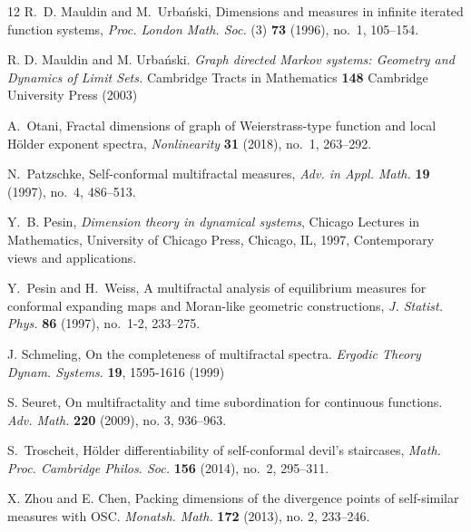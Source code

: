 \documentclass[11pt]{amsart}
\newcommand{\1}{1}
\begin{document}
\begin{thebibliography}{12}
R.~D. Mauldin and M.~Urba{\'n}ski, Dimensions and measures in infinite
  iterated function systems, {\em Proc. London Math. Soc.} (3) \textbf{73} (1996),  no.~1, 105--154. %

R. D. Mauldin and M. Urba\'nski.
{\it Graph directed Markov systems: Geometry and Dynamics of Limit Sets.} Cambridge Tracts in Mathematics
 {\bf  148} Cambridge University Press (2003)

A.~Otani, Fractal dimensions of graph of {W}eierstrass-type function and local {H}\"{o}lder exponent spectra, {\em Nonlinearity} \textbf{31} (2018), no.~1, 263--292. %

N.~Patzschke, Self-conformal multifractal measures, {\em Adv. in Appl. Math.}  \textbf{19} (1997), no.~4, 486--513. %


Y.~B. Pesin, \emph{Dimension theory in dynamical systems}, Chicago Lectures in  Mathematics, University of Chicago Press, Chicago, IL, 1997, Contemporary views and applications. %

Y.~Pesin and H.~Weiss, A multifractal analysis of equilibrium measures
  for conformal expanding maps and {M}oran-like geometric constructions, {\em J. Statist. Phys.} \textbf{86} (1997), no.~1-2, 233--275. %



J. Schmeling, On the completeness of multifractal spectra. {\em Ergodic Theory Dynam. Systems}. \textbf{19}, 1595-1616 (1999)

{S. Seuret}, On multifractality and time subordination for continuous functions. {\em Adv. Math.} {\bf 220} (2009), no. 3, 936--963.

S.~Troscheit, H\"{o}lder differentiability of self-conformal devil's
  staircases, {\em Math. Proc. Cambridge Philos. Soc.} \textbf{156} (2014), no.~2,
  295--311. %

{X. Zhou} and {E. Chen}, Packing dimensions of the divergence points of self-similar measures with OSC.
{\em Monatsh. Math.} {\bf 172} (2013), no. 2, 233--246.

\end{thebibliography}
\end{document}
